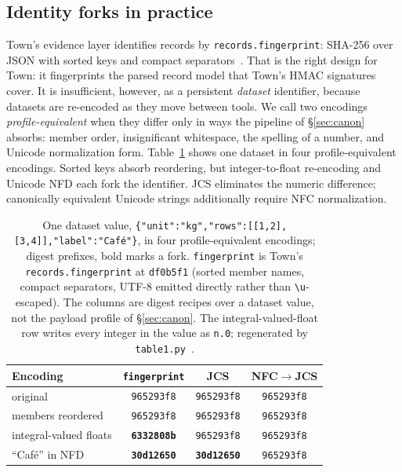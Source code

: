 \documentclass[conference]{IEEEtran}
\begin{document}
\subsection{Identity forks in practice}
Town's evidence layer identifies records by \texttt{records.fingerprint}: SHA-256 over JSON with sorted keys and compact separators~\cite{town}. That is the right design for Town: it fingerprints the parsed record model that Town's HMAC signatures cover. It is insufficient, however, as a persistent \emph{dataset} identifier, because datasets are re-encoded as they move between tools. We call two encodings \emph{profile-equivalent} when they differ only in ways the pipeline of \S\ref{sec:canon} absorbs: member order, insignificant whitespace, the spelling of a number, and Unicode normalization form. Table~\ref{tab:forks} shows one dataset in four profile-equivalent encodings. Sorted keys absorb reordering, but integer-to-float re-encoding and Unicode NFD each fork the identifier. JCS eliminates the numeric difference; canonically equivalent Unicode strings additionally require NFC normalization.

\begin{table}[t]
\caption{One dataset value, \texttt{\{"unit":"kg","rows":[[1,2],[3,4]],"label":"Caf\'e"\}}, in four profile-equivalent encodings; digest prefixes, bold marks a fork. \texttt{fingerprint} is Town's \texttt{records.fingerprint} at \texttt{df0b5f1} (sorted member names, compact separators, UTF-8 emitted directly rather than \texttt{\textbackslash u}-escaped). The columns are digest recipes over a dataset value, not the payload profile of \S\ref{sec:canon}. The integral-valued-float row writes every integer in the value as \texttt{n.0}; regenerated by \texttt{table1.py}~\cite{artifact}.}
\label{tab:forks}
\centering\small
\setlength{\tabcolsep}{3pt}
\begin{tabular}{l|c|c|c}
\hline
Encoding & \texttt{fingerprint} & JCS & NFC$\rightarrow$JCS \\
\hline
original & \texttt{965293f8} & \texttt{965293f8} & \texttt{965293f8}\\
members reordered & \texttt{965293f8} & \texttt{965293f8} & \texttt{965293f8}\\
integral-valued floats & \textbf{\texttt{6332808b}} & \texttt{965293f8} & \texttt{965293f8}\\
``Caf\'e'' in NFD & \textbf{\texttt{30d12650}} & \textbf{\texttt{30d12650}} & \texttt{965293f8}\\
\hline
\end{tabular}
\end{table}
\end{document}
